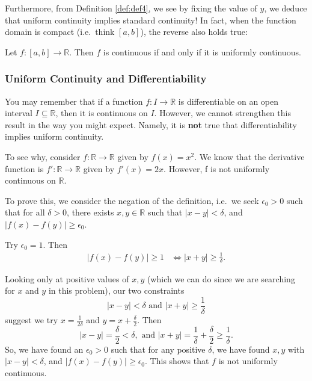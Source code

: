 \documentclass[
  17pt,
  a4paper]{extarticle}
\theoremstyle{plain}
\theoremstyle{definition}
\theoremstyle{plain}
\theoremstyle{plain}
\theoremstyle{plain}
\theoremstyle{plain}
\theoremstyle{definition}
\theoremstyle{definition}
\theoremstyle{remark}
\theoremstyle{remark}
\let\BeginKnitrBlock\begin \let\EndKnitrBlock\end
\renewcommand{\;}{\,}
\begin{document}
Furthermore, from Definition \ref{def:def4}, we see by fixing the value of \(y\), we deduce that uniform continuity implies standard continuity! In fact, when the function domain is compact (i.e.~think \([a,b]\)), the reverse also holds true:

\BeginKnitrBlock{proposition}
{\label{prp:prop2} }Let \(f:[a,b] \to \mathbb{R}\). Then \(f\) is continuous if and only if it is uniformly continuous.
\EndKnitrBlock{proposition}

\hypertarget{uniform-continuity-and-differentiability}{%
\subsubsection{Uniform Continuity and Differentiability}\label{uniform-continuity-and-differentiability}}

You may remember that if a function \(f:I \to \mathbb{R}\) is differentiable on an open interval \(I \subseteq \mathbb{R}\), then it is continuous on \(I\). However, we cannot strengthen this result in the way you might expect. Namely, it is \textbf{not} true that differentiability implies uniform continuity.

\BeginKnitrBlock{example}
{\label{exm:ex1} }To see why, consider \(f:\mathbb{R} \to \mathbb{R}\) given by \(f(x) = x^2\). We know that the derivative function is \(f':\mathbb{R} \to \mathbb{R}\) given by \(f'(x) = 2x.\) However, f is not uniformly continuous on \(\mathbb{R}\).

To prove this, we consider the negation of the definition, i.e.~we seek \(\epsilon_0 >0\) such that for all \(\delta > 0\), there exists \(x,y \in \mathbb{R}\) such that \(\lvert x - y \rvert < \delta\), and \(\lvert f(x) - f(y) \rvert \geq \epsilon_0.\)

Try \(\epsilon_0 = 1.\) Then
\begin{align*}
\lvert f(x) - f(y) \rvert \geq 1 &\Leftrightarrow \lvert x + y \rvert \geq \frac{1}{\delta}.
\end{align*}

Looking only at positive values of \(x,y\) (which we can do since we are searching for \(x\) and \(y\) in this problem), our two constraints \[\lvert x - y \rvert < \delta \;\; \text{and} \;\; \lvert x + y \rvert \geq \frac{1}{\delta}\] suggest we try \(x = \frac{1}{2\delta}\) and \(y = x + \frac{\delta}{2}.\) Then \[\lvert x - y \rvert = \frac{\delta}{2} < \delta, \;\; \text{and} \;\; \lvert x + y \rvert = \frac{1}{\delta} + \frac{\delta}{2} \geq \frac{1}{\delta}.\] So, we have found an \(\epsilon_0>0\) such that for any positive \(\delta\), we have found \(x,y\) with \(\lvert x - y \rvert < \delta\), and \(\lvert f(x) - f(y) \rvert \geq \epsilon_0.\) This shows that \(f\) is not uniformly continuous.
\EndKnitrBlock{example}
\end{document}
